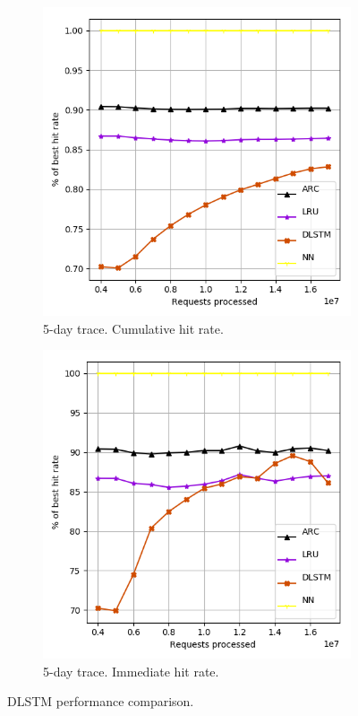 \begin{figure}[b!]
	\centering
	
	\begin{subfigure}[b]{0.49\linewidth}
		\includegraphics[width=\linewidth]{pics/dlstm_cum.png}
		\caption{5-day trace. Cumulative hit rate.}
	\end{subfigure}
	\begin{subfigure}[b]{0.49\linewidth}
		\includegraphics[width=\linewidth]{pics/dlstm_i.png}
		\caption{5-day trace. Immediate hit rate.}
	\end{subfigure}
	\caption{DLSTM performance comparison.}
	\label{fig:dlstm}
\end{figure}

